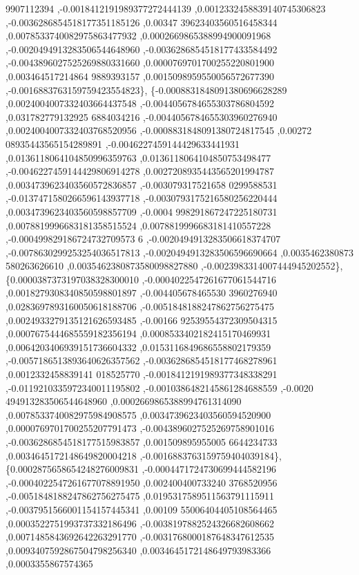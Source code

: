 \begin{DoxyCode}
      9907112394 ,-0.0018412191989377272444139 ,0.0012332458839140745306823 ,-0.0036286854518177351185126 ,0.00347
      39623403560516458344 ,0.0078533740082975863477932 ,0.0002669865388994900091968 ,-0.0020494913283506544648960
       ,-0.0036286854518177433584492 ,-0.0043896027525269880331660 ,0.0000769701700255220801900 ,0.003464517214864
      9889393157 ,0.0015098959550056572677390 ,-0.0016883763159759423554823\},
\{-0.0008831848091380696628289 ,0.0024004007332403664437548 ,-0.0044056784655303786804592 ,0.031782779132925
      6884034216 ,-0.0044056784655303960276940 ,0.0024004007332403768520956 ,-0.0008831848091380724817545 ,0.00272
      08935443565154289891 ,-0.0046227459144429633441931 ,0.0136118064104850996359763 ,0.0136118064104850753498477
       ,-0.0046227459144429806914278 ,0.0027208935443565201994787 ,0.0034739623403560572836857 ,-0.003079317521658
      0299588531 ,-0.0137471580266596143937718 ,-0.0030793175216580256220444 ,0.0034739623403560598857709 ,-0.0004
      998291867247225180731 ,0.0078819996683181358515524 ,0.0078819996683181410557228 ,-0.000499829186724732709573
      6 ,-0.0020494913283506618374707 ,-0.0078630299253254036517813 ,-0.0020494913283506596690664 ,0.0035462380873
      580263626610 ,0.0035462380873580098827880 ,-0.0023983314007444945202552\},
\{0.0000387373197038328300010 ,-0.0004022547261677061544716 ,0.0018279308340850598801897 ,-0.004405678465530
      3960276940 ,0.0283697893160050618188706 ,-0.0051848188247862756275475 ,0.0024933279135121626593485 ,-0.00166
      92539554372309504315 ,0.0007675444685559182356194 ,0.0008533402182415170469931 ,0.0064203406939151736604332 
      ,0.0153116849686558802179359 ,-0.0057186513893640626357562 ,-0.0036286854518177468278961 ,0.0012332458839141
      018525770 ,-0.0018412191989377348338291 ,-0.0119210335972340011195802 ,-0.0010386482145861284688559 ,-0.0020
      494913283506544648960 ,0.0002669865388994761314090 ,0.0078533740082975984908575 ,0.0034739623403560594520900
       ,0.0000769701700255207791473 ,-0.0043896027525269758901016 ,-0.0036286854518177515983857 ,0.001509895955005
      6644234733 ,0.0034645172148649820004218 ,-0.0016883763159759404039184\},
\{0.0002875658654248276009831 ,-0.0004471724730699444582196 ,-0.0004022547261677078891950 ,0.002400400733240
      3768520956 ,-0.0051848188247862756275475 ,0.0195317589511563791115911 ,-0.0037951566001154157445341 ,0.00109
      55006404405108564465 ,0.0003522751993737332186496 ,-0.0038197882524326682608662 ,0.0071485843692642263291770
       ,-0.0031768000187648347612535 ,0.0093407592867504798256340 ,0.0034645172148649793983366 ,0.0003355867574365

\end{DoxyCode}
